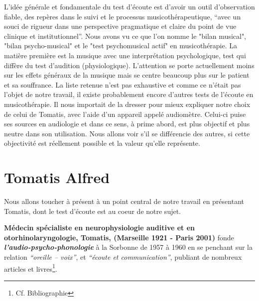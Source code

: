 L'idée générale et fondamentale du test d'écoute est d'avoir un outil d'observation fiable, des repères dans le suivi et le processus musicothérapeutique, \enquote {avec un souci de rigueur dans une perspective pragmatique et claire du point de vue clinique et institutionnel}\autocite[p. 36]{vrait_musicotherapie_2018}. %
Nous avons vu ce que l'on nomme le "bilan musical", "bilan psycho-musical" et le  "test psychomusical actif" en musicothérapie. La matière première est la musique avec une interprétation psychologique, test qui diffère du test d'audition (physiologique). L'attention se porte actuellement moins sur les effets généraux de la musique  mais se centre beaucoup plus sur le patient et sa souffrance.
La liste retenue n'est pas exhaustive et comme ce n'était pas l'objet de notre travail, il existe probablement encore d'autres tests de l'écoute en musicothérapie.
Il nous importait de la dresser pour mieux expliquer notre choix de celui de  Tomatis, avec l'aide d'un appareil appelé audiomètre. Celui-ci puise ses sources en audiologie et dans ce sens, à prime abord, est plus objectif et plus neutre dans son utilisation. Nous allons voir s'il se différencie des autres, si cette objectivité est réellement possible et la valeur qu'elle représente.



\chapter{Tomatis Alfred}
Nous allons toucher à présent à un point central de notre travail en présentant
Tomatis, dont le test d'écoute est au coeur de notre sujet.


\textbf{Médecin spécialiste en neurophysiologie auditive et en
oto\-rhino\-la\-ryn\-go\-lo\-gie, Tomatis, (Marseille 1921 - Paris 2001)} fonde
\textit{\textbf{l'audio-psycho-phonologie}} à la Sorbonne de
1957 à 1960 en  se penchant sur la relation
\textit{``oreille -- voix''}, et \textit{``écoute
et communication''}, publiant de nombreux articles et livres\footnote{Cf. Bibliographie}.
